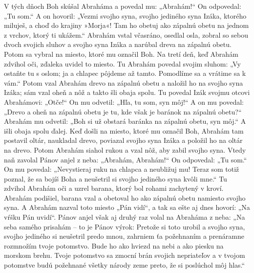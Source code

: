 V tých dňoch Boh skúšal Abraháma a povedal mu: „Abrahám!“ On odpovedal: „Tu som.“ 
A on hovoril: „Vezmi svojho syna, svojho jediného syna Izáka, ktorého miluješ, a choď do krajiny »Morja«! Tam ho obetuj ako zápalnú obetu na jednom z vrchov, ktorý ti ukážem.“ 
\versseparator
Abrahám vstal včasráno, osedlal osla, zobral so sebou dvoch svojich sluhov a svojho syna Izáka a narúbal dreva na zápalnú obetu. Potom sa vybral na miesto, ktoré mu označil Boh. Na tretí deň, keď Abrahám zdvihol oči, zďaleka uvidel to miesto. 
Tu Abrahám povedal svojim sluhom: „Vy ostaňte tu s oslom; ja a chlapec pôjdeme až tamto. Pomodlíme sa a vrátime sa k vám.“ 
\versseparator
Potom vzal Abrahám drevo na zápalnú obetu a naložil ho na svojho syna Izáka; sám vzal oheň a nôž a takto šli obaja spolu. Tu povedal Izák svojmu otcovi Abrahámovi: „Otče!“ On mu odvetil: „Hľa, tu som, syn môj!“ A on mu povedal: „Drevo a oheň na zápalnú obetu je tu, kde však je baránok na zápalnú obetu?“ Abrahám mu odvetil: „Boh si už obstará baránka na zápalnú obetu, syn môj.“ A išli obaja spolu ďalej. 
\versseparator
Keď došli na miesto, ktoré mu označil Boh, Abrahám tam postavil oltár, naukladal drevo, poviazal svojho syna Izáka a položil ho na oltár na drevo. Potom Abrahám siahol rukou a vzal nôž, aby zabil svojho syna. Vtedy naň zavolal Pánov anjel z neba: „Abrahám, Abrahám!“ On odpovedal: „Tu som.“ On mu povedal: „Nevystieraj ruku na chlapca a neubližuj mu! Teraz som totiž poznal, že sa bojíš Boha a neušetril si svojho jediného syna kvôli mne.“ Tu zdvihol Abrahám oči a uzrel barana, ktorý bol rohami zachytený v kroví. Abrahám podišiel, barana vzal a obetoval ho ako zápalnú obetu namiesto svojho syna. 
A Abrahám nazval toto miesto „Pán vidí“, a tak sa ešte aj dnes hovorí: „Na vŕšku Pán uvidí“.
\versseparator
Pánov anjel však aj druhý raz volal na Abraháma z neba: „Na seba samého prisahám – to je Pánov výrok: Pretože si toto urobil a svojho syna, svojho jediného si neušetril predo mnou, zahrniem ťa požehnaním a prenáramne rozmnožím tvoje potomstvo. Bude ho ako hviezd na nebi a ako piesku na morskom brehu. Tvoje potomstvo sa zmocní brán svojich nepriateľov a v tvojom potomstve budú požehnané všetky národy zeme preto, že si poslúchol môj hlas.“